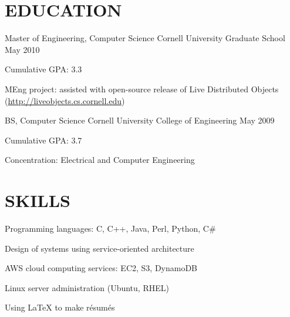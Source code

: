 \documentclass{res}
\begin{document}
\begin{resume}
\section{{\large E}DUCATION}

\affiliation
	{Master of Engineering, Computer Science}
	{Cornell University Graduate School}
	{May 2010}
	\begin{pos}
	\item Cumulative GPA: 3.3
	\item MEng project: assisted with open-source release of Live Distributed Objects
		(\url{http://liveobjects.cs.cornell.edu})
	\end{pos}

\affiliation
	{BS, Computer Science}
	{Cornell University College of Engineering}
	{May 2009}
	\begin{pos}
	\item Cumulative GPA: 3.7
	\item Concentration: Electrical and Computer Engineering
	\end{pos}


\section{{\large S}KILLS}
	\vspace{10pt}
	\begin{compactitem}
	\item Programming languages: C, C++, Java, Perl, Python, C\#
	\item Design of systems using service-oriented architecture
	\item AWS cloud computing services: EC2, S3, DynamoDB
	\item Linux server administration (Ubuntu, RHEL)
	\item Using \LaTeX{} to make r\'esum\'es
	\end{compactitem}

\end{resume}
\end{document}
